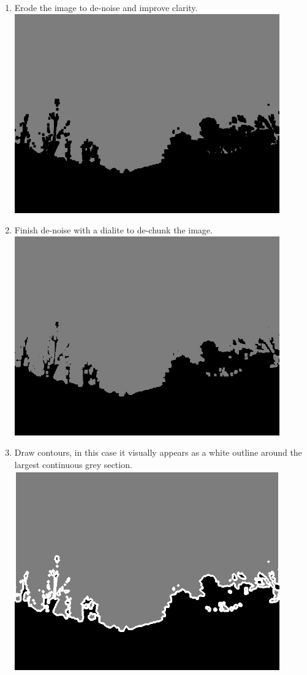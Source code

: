 \documentclass[onecolumn, draftclsnofoot,10pt, compsoc]{IEEEtran}
\begin{document}
\begin{singlespace}
\begin{enumerate}
						\item Erode the image to de-noise and improve clarity.\\
							\includegraphics[width=4.5in,natwidth=640,natheight=480]{images/threshold/6.jpg}
						\item Finish de-noise with a dialite to de-chunk the image.\\
							\includegraphics[width=4.5in,natwidth=640,natheight=480]{images/threshold/7.jpg}
						\item Draw contours, in this case it visually appears as a white outline around the largest continuous grey section.\\
							\includegraphics[width=4.5in,natwidth=640,natheight=480]{images/threshold/8.jpg}

\end{enumerate}
\end{singlespace}
\end{document}
